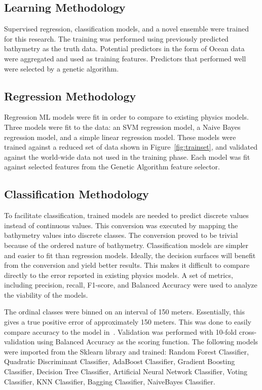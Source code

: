 \subsection{Learning Methodology}
Supervised regression, classification models, and a novel ensemble were trained for this research.
The training was performed using previously predicted bathymetry as the truth data.
Potential predictors in the form of Ocean data were aggregated and used as training features.
Predictors that performed well were selected by a genetic algorithm.

\subsection{Regression Methodology}
Regression \ac{ML} models were fit in order to compare to existing physics models.
Three models were fit to the data: 
an SVM regression model, a Naive Bayes regression model, and a simple linear regression model.
These models were trained against a reduced set of data shown in Figure~\ref{fig:trainset}, and validated against the world-wide data not used in the training phase.
Each model was fit against selected features from the Genetic Algorithm feature selector.

\subsection{Classification Methodology}
To facilitate classification, trained models are needed to predict discrete values instead of continuous values.
This conversion was executed by mapping the bathymetry values into discrete classes.
The conversion proved to be trivial because of the ordered nature of bathymetry.
Classification models are simpler and easier to fit than regression models.
Ideally, the decision surfaces will benefit from the conversion and yield better results.
This makes it difficult to compare directly to the error reported in existing physics models.
A set of metrics, including precision, recall, F1-score, and Balanced Accuracy were used to analyze the viability of the models.

\par
The ordinal classes were binned on an interval of 150 meters.
Essentially, this gives a true positive error of approximately 150 meters.
This was done to easily compare accuracy to the model in~\cite{jena2012prediction}.
Validation was performed with 10-fold cross-validation using Balanced Accuracy as the scoring function.
The following models were imported from the Sklearn library and trained: Random Forest Classifier, Quadratic Discriminant Classifier, AdaBoost Classifier, Gradient Boosting Classifier, Decision Tree Classifier, Artificial Neural Network Classifier, Voting Classifier, KNN Classifier, Bagging Classifier, NaiveBayes Classifier.


